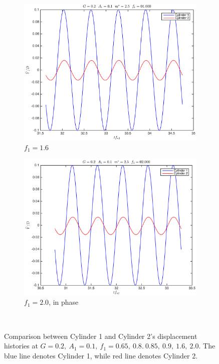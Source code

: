 \begin{figure}[tbp]
\begin{subfigure}[t]{\widthp\textwidth}
		\label{fig:freq0.9}
	\end{subfigure}\\%
	\begin{subfigure}[t]{\widthp\textwidth}
		\centering
		\includegraphics[width=1\linewidth]{Figs/Plotting_g0.20a0.100m2.5zl_r48_01.600_VIV02}
		\caption{$ f_1=1.6 $}
		\label{fig:freq1.6}
	\end{subfigure}%
	\begin{subfigure}[t]{\widthp\textwidth}
		\centering
		\includegraphics[width=1\linewidth]{Figs/Plotting_g0.20a0.100m2.5zl_r48_02.000_VIV02}
		\caption{$ f_1=2.0 $, in phase}
		\label{fig:freq2.0}
	\end{subfigure}\\%
	\caption{
		Comparison between Cylinder 1 and Cylinder 2's displacement histories at $ G=0.2,\ A_1=0.1,\ f_1=0.65,\ 0.8.\ 0.85,\ 0.9,\ 1.6,\ 2.0$. The blue line denotes Cylinder 1, while red line denotes Cylinder 2.
	}
	\label{fig:freqcheck}
\end{figure}

